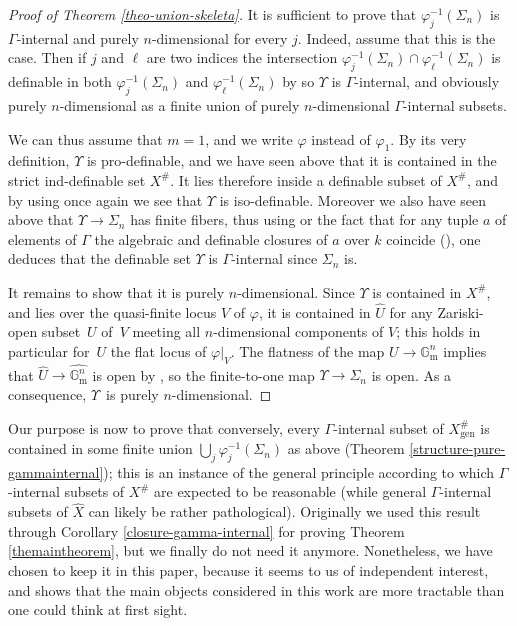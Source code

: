 \documentclass[JEP,XML,SOM,Unicode,ThmDefs,NoEqCountersInSection,published]{cedram}
\newcommand{\gm}{\bG_{\mathrm m}}
\newcommand{\bG}{\mathbb G}
\let\phi\varphi
\theoremstyle{plain}
\theoremstyle{definition}
\begin{document}
\begin{proof}[Proof of Theorem \ref{theo-union-skeleta}]
It is sufficient to prove that $\phi_j^{-1}(\Sigma_n)$
is $\Gamma$-internal and purely $n$\nobreakdash-dimen\-sional for every $j$.
Indeed, assume that this is the case. Then
if $j$ and $\ell$ are two indices the intersection
$\phi_j^{-1}(\Sigma_n)\cap \phi_\ell^{-1}(\Sigma_n)$ is definable in both $\phi_j^{-1}(\Sigma_n)$ and $\phi_\ell^{-1}(\Sigma_n)$
by \cite[Lem.\,8.2.9]{HL} so $\Upsilon$ is $\Gamma$-internal, and obviously purely $n$\nobreakdash-dimen\-sional
as a finite union of purely $n$\nobreakdash-dimen\-sional $\Gamma$-internal subsets.

We can thus assume that $m=1$, and we write $\phi$ instead of $\phi_1$.
By its very definition, $\Upsilon$ is pro-definable, and we have seen above that it
is contained in the strict ind-definable set $X^\#$.
It lies therefore inside a definable subset of $X^\#$, and by using once again \cite[Lem.\,8.2.9]{HL}
we see that $\Upsilon$ is iso-definable.
Moreover we also have seen above that $\Upsilon\to \Sigma_n$ has finite fibers, thus using
\cite[Cor.\,2.8.4]{HL} or
the fact that for any tuple $a$ of elements of $\Gamma$ the algebraic and definable
closures of $a$ over $k$ coincide (\cite[Lem.\,3.4.12]{haskell-h-m2006}),
one deduces that
the definable set $\Upsilon$ is $\Gamma$-internal since $\Sigma_n$ is.

It remains to show that it is purely $n$\nobreakdash-dimen\-sional.
Since $\Upsilon$ is contained in $X^\#$, and lies over the quasi-finite locus $V$ of $\phi$,
it is contained in $\widehat U$ for any Zariski-open subset~$U$
of~$V$ meeting all $n$\nobreakdash-dimen\-sional components of $V$; this holds in particular for~$U$ the flat locus of
$\phi|_V$. The flatness of the map $U\to \gm^n$ implies that $\widehat U\to \widehat{\gm^n}$
is open by \cite[Cor.\,9.7.2]{HL}, so the finite-to-one map $\Upsilon\to \Sigma_n$ is open. As a consequence,
$\Upsilon$~is purely $n$\nobreakdash-dimen\-sional.
\end{proof}

Our purpose is now to prove that conversely,
every
$\Gamma$-internal subset of $X^\#_{\mathrm{gen}}$
is contained in some finite union
$\bigcup_j \phi_j^{-1}(\Sigma_n)$ as above
(Theorem \ref{structure-pure-gammainternal});
this is an instance of the general principle according to
which $\Gamma$-internal subsets
of $X^\#$ are expected to be reasonable
(while general $\Gamma$-internal subsets
of $\widehat X$ can likely
be rather pathological).
Originally we used this result
through Corollary
\ref{closure-gamma-internal}
for proving Theorem
\ref{themaintheorem},
but we finally do not need it anymore.
Nonetheless, we have chosen to keep it in this paper,
because it seems to us
of independent interest, and shows that the main
objects considered
in this work are more tractable
than one could
think at first sight.
\end{document}
